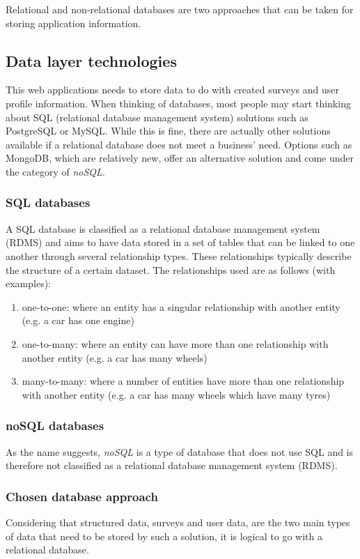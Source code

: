 Relational and non-relational databases are two approaches that can be taken for storing application information.


\subsection{Data layer technologies}
This web applications needs to store data to do with created surveys and user profile information.
When thinking of databases, most people may start thinking about SQL (relational database management system) solutions such 
as PostgreSQL or MySQL.
While this is fine, there are actually other solutions available if a relational database does not meet a business' need. 
Options such as MongoDB, which are relatively new, offer an alternative solution and come under the category of \textit{noSQL}. 

\subsubsection*{SQL databases}
A SQL database is classified as a relational database management system (RDMS) and aims to have data stored in a set of tables that
can be linked to one another through several relationship types. These relationships typically describe the structure of a certain dataset.
The relationships used are as follows (with examples): 

\begin{enumerate}
    \item one-to-one: where an entity has a singular relationship with another entity (e.g. a car has one engine)
    \item one-to-many: where an entity can have more than one relationship with another entity (e.g. a car has many wheels)
    \item many-to-many: where a number of entities have more than one relationship with another entity (e.g. a car has many wheels which have many tyres)
\end{enumerate}

\subsubsection*{noSQL databases}
As the name suggests, \textit{noSQL} is a type of database that does not use SQL and is therefore not classified as a relational database
management system (RDMS).



\subsubsection*{Chosen database approach}
Considering that structured data, surveys and user data, are the two main types of data that need to be stored by such a solution, it is logical to go with a relational database.


